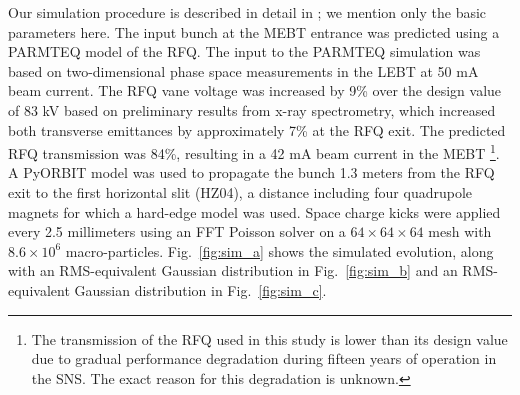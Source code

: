 \documentclass[%
 reprint,
 amsmath,amssymb,
 aps,
prstab,
]{revtex4-2}
\begin{document}
Our simulation procedure is described in detail in \cite{Ruisard2020}; we mention only the basic parameters here. The input bunch at the MEBT entrance was predicted using a PARMTEQ \cite{Crandall1988a} model of the RFQ. The input to the PARMTEQ simulation was based on two-dimensional phase space measurements in the LEBT at 50 mA beam current. The RFQ vane voltage was increased by 9\% over the design value of 83 kV based on preliminary results from x-ray spectrometry, which increased both transverse emittances by approximately 7\% at the RFQ exit. The predicted RFQ transmission was 84\%, resulting in a 42 mA beam current in the MEBT \footnote{The transmission of the RFQ used in this study is lower than its design value due to gradual performance degradation during fifteen years of operation in the SNS. The exact reason for this degradation is unknown.}. A PyORBIT \cite{Shishlo2015} model was used to propagate the bunch 1.3 meters from the RFQ exit to the first horizontal slit (HZ04), a distance including four quadrupole magnets for which a hard-edge model was used. Space charge kicks were applied every 2.5 millimeters using an FFT Poisson solver on a $64 \times 64 \times 64$ mesh with $8.6 \times 10^6$ macro-particles. Fig.~\ref{fig:sim_a} shows the simulated evolution, along with an RMS-equivalent Gaussian distribution in Fig.~\ref{fig:sim_b} and an RMS-equivalent Gaussian distribution in Fig.~\ref{fig:sim_c}.
%
%
%
\end{document}
